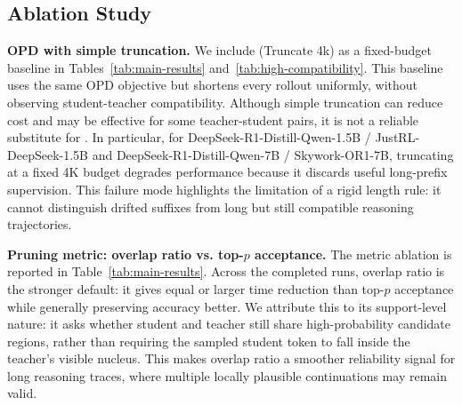 \subsection{Ablation Study}

\noindent\textbf{OPD with simple truncation.}
We include \opd{} (Truncate 4k) as a fixed-budget baseline in Tables~\ref{tab:main-results} and~\ref{tab:high-compatibility}.
This baseline uses the same OPD objective but shortens every rollout uniformly, without observing student-teacher compatibility.
Although simple truncation can reduce cost and may be effective for some teacher-student pairs, it is not a reliable substitute for \method.
In particular, for DeepSeek-R1-Distill-Qwen-1.5B / JustRL-DeepSeek-1.5B and DeepSeek-R1-Distill-Qwen-7B / Skywork-OR1-7B, truncating at a fixed 4K budget degrades performance because it discards useful long-prefix supervision.
This failure mode highlights the limitation of a rigid length rule: it cannot distinguish drifted suffixes from long but still compatible reasoning trajectories.

\noindent\textbf{Pruning metric: overlap ratio vs. top-$p$ acceptance.}
The metric ablation is reported in Table~\ref{tab:main-results}.
Across the completed runs, overlap ratio is the stronger default: it gives equal or larger time reduction than top-$p$ acceptance while generally preserving accuracy better.
We attribute this to its support-level nature: it asks whether student and teacher still share high-probability candidate regions, rather than requiring the sampled student token to fall inside the teacher's visible nucleus.
This makes overlap ratio a smoother reliability signal for long reasoning traces, where multiple locally plausible continuations may remain valid.


